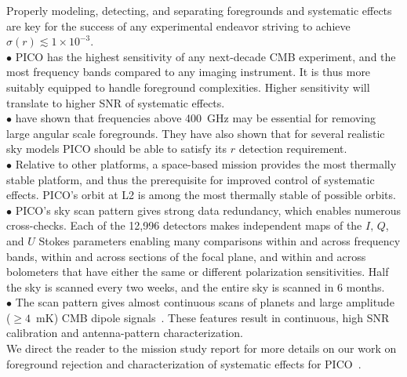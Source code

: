 \documentclass[PICOAPC.tex]{subfiles}
\begin{document}
Properly modeling, detecting, and separating foregrounds and systematic effects are key for the success of any experimental endeavor striving to achieve $\sigma(r) \lesssim 1 \times 10^{-3}$. \\
$\bullet$ \hspace{0.1in}  PICO has the highest sensitivity of any next-decade CMB experiment, and the most frequency bands compared to any imaging instrument. It is thus more suitably equipped to handle foreground complexities. Higher sensitivity will translate to higher \ac{SNR} of systematic effects. \\ 
$\bullet$ \hspace{0.1in}  \citet{pico_report} have shown that frequencies above 400~GHz may be essential for removing large angular scale foregrounds. They have also shown that for several realistic sky models PICO should be able to satisfy its $r$ detection requirement.  \\
$\bullet$ \hspace{0.1in}  Relative to other platforms, a space-based mission provides the most thermally stable platform, and thus the prerequisite for improved control of systematic effects. PICO's orbit at L2 is among the most thermally stable of possible orbits. \\
$\bullet$ \hspace{0.1in} PICO's sky scan pattern gives strong data redundancy, which enables numerous cross-checks. Each of the 12,996 detectors makes independent maps of the $I,\,Q$, and $U$ Stokes parameters enabling many comparisons within and across frequency bands, within and across sections of the focal plane, and within and across bolometers that have either the same or different polarization sensitivities. Half the sky is scanned every two weeks, and the entire sky is scanned in 6 months. \\
$\bullet$ \hspace{0.1in}  The scan pattern gives almost continuous scans of planets and large amplitude ($\geq 4$~mK) CMB dipole signals~\citep{picoweb_dipole}. These features result in continuous, high \ac{SNR} calibration and antenna-pattern characterization. \\
We direct the reader to the mission study report for more details on our work on foreground rejection and characterization of systematic effects for PICO~\citep{pico_report}.
\end{document}
